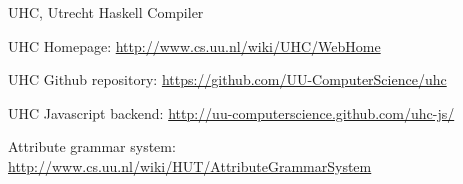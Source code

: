 \begin{hcarentry}[section]{UHC, Utrecht Haskell Compiler}
\FurtherReading
\begin{compactitem}
\item UHC Homepage:
\url{http://www.cs.uu.nl/wiki/UHC/WebHome}

\item UHC Github repository:
\url{https://github.com/UU-ComputerScience/uhc}

\item UHC Javascript backend:
\url{http://uu-computerscience.github.com/uhc-js/}

\item Attribute grammar system:
\url{http://www.cs.uu.nl/wiki/HUT/AttributeGrammarSystem}

\end{compactitem}
\end{hcarentry}
